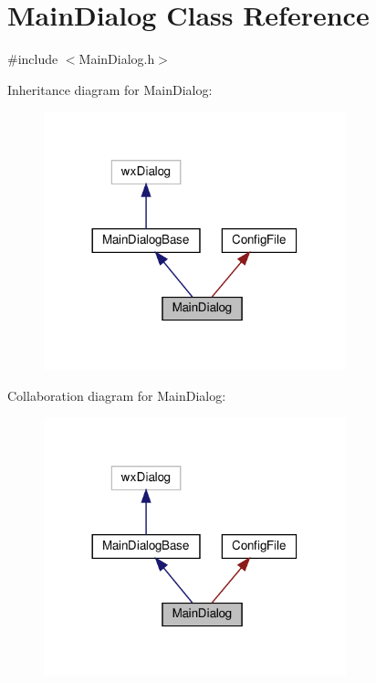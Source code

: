 \hypertarget{classMainDialog}{}\section{Main\+Dialog Class Reference}
\label{classMainDialog}


{\ttfamily \#include $<$Main\+Dialog.\+h$>$}



Inheritance diagram for Main\+Dialog\+:\nopagebreak
\begin{figure}[H]
\begin{center}
\leavevmode
\includegraphics[width=248pt]{classMainDialog__inherit__graph}
\end{center}
\end{figure}


Collaboration diagram for Main\+Dialog\+:\nopagebreak
\begin{figure}[H]
\begin{center}
\leavevmode
\includegraphics[width=248pt]{classMainDialog__coll__graph}
\end{center}
\end{figure}
